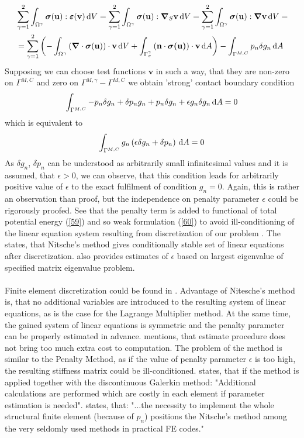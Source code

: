 \documentclass{article}
\newcommand{\beq}{\begin{equation}}
\newcommand{\eeq}{\end{equation}}
\newcommand{\bea}{\begin{eqnarray}}
\newcommand{\eea}{\end{eqnarray}}
\newcommand{\dd}{\,{\rm d}}
\begin{document}
\bea\label{62}
\begin{aligned}
&\sum^{2}_{\gamma = 1}\int_{\Omega^{\gamma}} \bm{\sigma}(\mathbf{u}) : \bm{\varepsilon}(\mathbf{v}) \dd V = \sum^{2}_{\gamma = 1}\int_{\Omega^{\gamma}} \bm{\sigma}(\mathbf{u}) : \bm{\nabla}_{S}\mathbf{v} \dd V =\sum^{2}_{\gamma = 1}\int_{\Omega^{\gamma}} \bm{\sigma}(\mathbf{u}) : \bm{\nabla}\mathbf{v} \dd V =
\\
&=\sum^{2}_{\gamma = 1}\left(-\int_{\Omega^{\gamma}}\left(\bm{\nabla}\cdot\bm{\sigma}(\mathbf{u})\right) \cdot \mathbf{v} \dd V + \int_{\Gamma^{\gamma}_{\sigma}} \left(\mathbf{n}\cdot\bm{\sigma(\mathbf{u})} \right)\cdot\mathbf{v}\dd A\right)-\int_{\Gamma^{M,C}} p_{n} \delta g_{n} \dd A
\end{aligned}
\eea 
Supposing we can choose test functions $\mathbf{v}$ in such a way, that they are non-zero on $ \Gamma^{M,C} $ and zero on $ \Gamma^{M,\gamma}-\Gamma^{M,C} $ we obtain 'strong' contact boundary condition
\beq\label{63}
\int_{\Gamma^{M,C}} -p_{n} \delta g_{n} +\delta p_{n} g_{n}+ p_{n} \delta g_{n}+\epsilon g_{n} \delta g_{n} \dd A = 0
\eeq
which is equivalent to    
\beq\label{64}
\int_{\Gamma^{M,C}} g_{n}\left(\epsilon  \delta g_{n}+\delta p_{n}\right) \dd A = 0
\eeq 
As $ \delta g_{n} $, $ \delta p_{n} $ can be understood as arbitrarily small infinitesimal values and it is assumed, that $\epsilon > 0$, we can observe, that this condition leads for arbitrarily positive value of $ \epsilon $ to the exact fulfilment of condition $ g_{n} = 0 $. Again, this is rather an observation than proof, but the independence on penalty parameter $\epsilon $ could be rigorously proofed. See that the penalty term is added to functional of total potential energy  (\ref{59}) and so weak formulation (\ref{60}) to avoid ill-conditioning of the linear equation system resulting from discretization of our problem \cite[Chapter 5, p.106]{Wriggers}. The \cite{Augarde} states, that Nitsche's method gives conditionally stable set of linear equations after discretization. \cite{Augarde} also provides estimates of $\epsilon $ based on largest eigenvalue of specified matrix eigenvalue problem. 
\\
\\
Finite element discretization could be found in \cite[Chapter 7, p.194-198]{Wriggers}. Advantage of Nitesche's method is, that no additional variables are introduced to the resulting system of linear equations, as is the case for the Lagrange Multiplier method. At the same time, the gained system of linear equations is symmetric and the penalty parameter can be properly estimated in advance. \cite{Augarde} mentions, that estimate procedure does not bring too much extra cost to computation. The problem of the method is similar to the Penalty Method, as if the value of penalty parameter $\epsilon$ is too high, the resulting stiffness matrix could be ill-conditioned. \cite{Augarde} states, that if the method is applied together with the discontinuous Galerkin method: "Additional calculations are performed which are costly in each element if parameter estimation is needed". \cite[Chapter 6, p.83]{Izi} states, that: "...the necessity to implement the whole structural finite element (because of $p_{n}$) positions the Nitsche's method among the very seldomly used methods in practical FE codes."  
\end{document}
